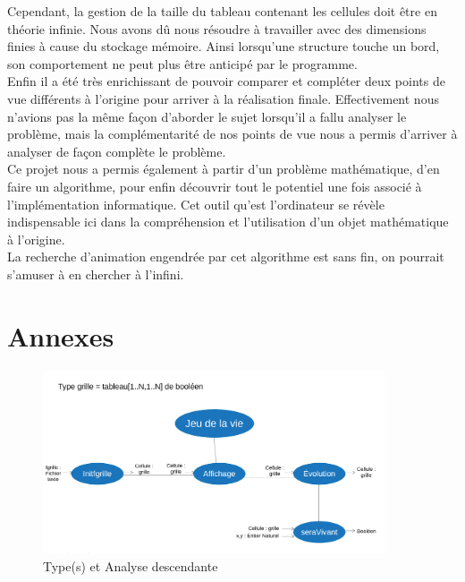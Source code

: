 \documentclass[12,french]{report}
\begin{document}
Cependant, la gestion de la taille du tableau contenant les cellules doit être en théorie infinie. Nous avons dû nous résoudre à travailler avec des dimensions finies à cause du stockage mémoire. Ainsi lorsqu'une structure touche un bord, son comportement ne peut plus être anticipé par le programme.\\

Enfin il a été très enrichissant de pouvoir comparer et compléter deux points de vue différents à l'origine pour arriver à la réalisation finale. Effectivement nous n'avions pas la même façon d'aborder le sujet lorsqu'il a fallu analyser le problème, mais la complémentarité de nos points de vue nous a permis d'arriver à analyser de façon complète le problème.\\

Ce projet nous a permis également à partir d'un problème mathématique, d'en faire un algorithme, pour enfin découvrir tout le potentiel une fois associé à l'implémentation informatique. Cet outil qu'est l'ordinateur se révèle indispensable ici dans la compréhension et l'utilisation d'un objet mathématique à l'origine.\\

La recherche d'animation engendrée par cet algorithme est sans fin, on pourrait s'amuser à en chercher à l'infini.

\chapter*{Annexes}

\begin{figure}[H]
	\center
	\includegraphics[width=0.9\textwidth]{./Images/Analyse_descendante}
	\caption{Type(s) et Analyse descendante}
\end{figure}\vspace{0.1cm}
\end{document}
